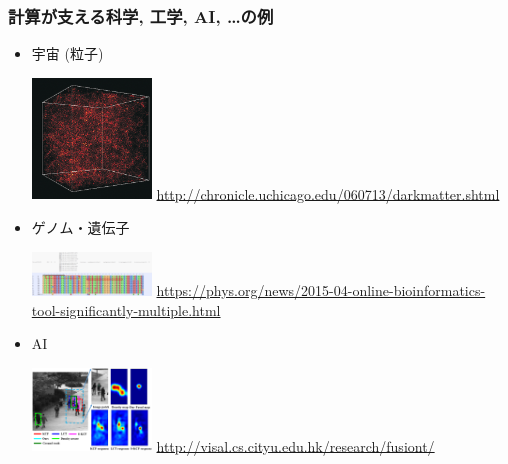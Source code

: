 \documentclass[12pt,dvipdfmx]{beamer}
\begin{document}
\begin{frame}
  \frametitle{計算が支える科学, 工学, AI, \ldots の例}
  \begin{itemize}
  \item 宇宙 (粒子)

    \includegraphics[width=0.25\textwidth]{out/pdf/img/darkmatter.pdf}
    {\tiny\url{http://chronicle.uchicago.edu/060713/darkmatter.shtml}}
  
  \item ゲノム・遺伝子

    \includegraphics[width=0.25\textwidth]{out/pdf/img/genome.pdf}
    {\tiny\url{https://phys.org/news/2015-04-online-bioinformatics-tool-significantly-multiple.html}}

  \item AI

    \includegraphics[width=0.25\textwidth]{out/pdf/img/ai.pdf}
    {\tiny\url{http://visal.cs.cityu.edu.hk/research/fusiont/}}
  \end{itemize}
\end{frame}
\end{document}
